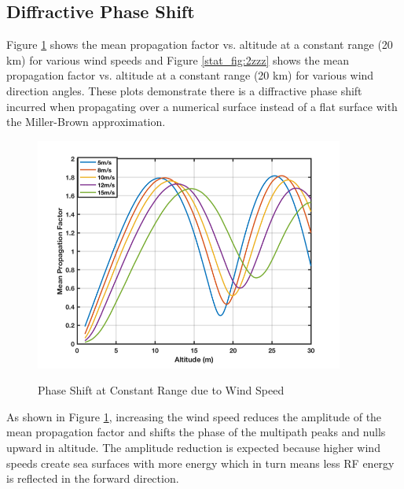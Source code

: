 \subsection{Diffractive Phase Shift}
Figure \ref{stat_fig:2zz} shows the mean propagation factor vs. altitude at a constant range (20 km) for various wind speeds and Figure \ref{stat_fig:2zzz} shows the mean propagation factor vs. altitude at a constant range (20 km) for various wind direction angles. These plots demonstrate there is a diffractive phase shift incurred when propagating over a numerical surface instead of a flat surface with the Miller-Brown approximation.

\begin{figure}[H]
  \begin{center}
\includegraphics[width=4in]{../media/statistics/phase_shift_wind_speed.png}
  \end{center}
  \renewcommand{\baselinestretch}{1} \small\normalsize
  \begin{quote}
    \caption[Phase Shift at Constant Range due to Wind Speed]{Phase Shift at Constant Range due to Wind Speed\label{stat_fig:2zz}}
  \end{quote}
\end{figure}
\renewcommand{\baselinestretch}{2} \small\normalsize

As shown in Figure \ref{stat_fig:2zz}, increasing the wind speed reduces the amplitude of the mean propagation factor and shifts the phase of the multipath peaks and nulls upward in altitude. The amplitude reduction is expected because higher wind speeds create sea surfaces with more energy which in turn means less RF energy is reflected in the forward direction.

